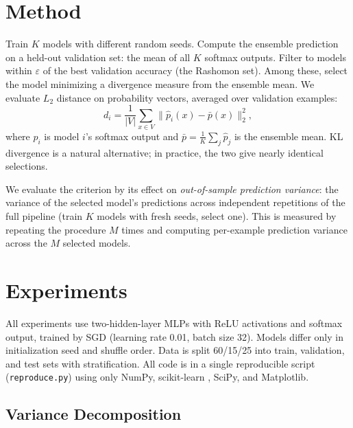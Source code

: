 \documentclass[11pt]{article}
\begin{document}
\section{Method}
\label{sec:method}

Train $K$ models with different random seeds.
Compute the ensemble prediction on a held-out validation set: the mean of all $K$ softmax outputs.
Filter to models within $\varepsilon$ of the best validation accuracy (the Rashomon set).
Among these, select the model minimizing a divergence measure from the ensemble mean.
We evaluate $L_2$ distance on probability vectors, averaged over validation examples:
\begin{equation}
  d_i = \frac{1}{|V|} \sum_{x \in V} \| \hat{p}_i(x) - \bar{p}(x) \|_2^2,
\end{equation}
where $\hat{p}_i$ is model $i$'s softmax output and $\bar{p} = \frac{1}{K}\sum_j \hat{p}_j$ is the ensemble mean.
KL divergence is a natural alternative; in practice, the two give nearly identical selections.

We evaluate the criterion by its effect on \emph{out-of-sample prediction variance}: the variance of the selected model's predictions across independent repetitions of the full pipeline (train $K$ models with fresh seeds, select one).
This is measured by repeating the procedure $M$ times and computing per-example prediction variance across the $M$ selected models.


\section{Experiments}
\label{sec:experiments}

All experiments use two-hidden-layer MLPs with ReLU activations and softmax output, trained by SGD (learning rate 0.01, batch size 32).
Models differ only in initialization seed and shuffle order.
Data is split 60/15/25 into train, validation, and test sets with stratification.
All code is in a single reproducible script (\texttt{reproduce.py}) using only NumPy, scikit-learn \citep{scikit-learn}, SciPy, and Matplotlib.


\subsection{Variance Decomposition}
\label{sec:decomp}
\end{document}
